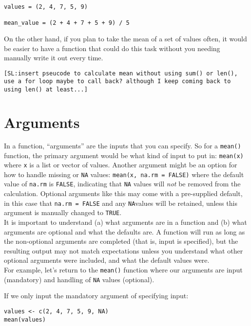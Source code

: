 \documentclass[
]{book}
\begin{document}
\begin{verbatim}
values = (2, 4, 7, 5, 9)

mean_value = (2 + 4 + 7 + 5 + 9) / 5
\end{verbatim}

\hfill\break
On the other hand, if you plan to take the mean of a set of values often, it would be easier to have a function that could do this task without you needing manually write it out every time.

\begin{verbatim}
[SL:insert pseucode to calculate mean without using sum() or len(), use a for loop maybe to call back? although I keep coming back to using len() at least...]
\end{verbatim}

\section{Arguments}\label{arguments}

In a function, ``arguments'' are the inputs that you can specify. So for a \texttt{mean()} function, the primary argument would be what kind of input to put in: \texttt{mean(x)} where \texttt{x} is a list or vector of values. Another argument might be an option for how to handle missing or \texttt{NA} values: \texttt{mean(x,\ na.rm\ =\ FALSE)} where the default value of \texttt{na.rm} is \texttt{FALSE}, indicating that \texttt{NA} values will \emph{not} be removed from the calculation. Optional arguments like this may come with a pre-supplied default, in this case that \texttt{na.rm\ =\ FALSE} and any \texttt{NA}values will be retained, unless this argument is manually changed to \texttt{TRUE}.\\

It is important to understand (a) what arguments are in a function and (b) what arguments are optional and what the defaults are. A function will run as long as the non-optional arguments are completed (that is, input is specified), but the resulting output may not match expectations unless you understand what other optional arguments were included, and what the default values were.\\

For example, let's return to the \texttt{mean()} function where our arguments are input (mandatory) and handling of \texttt{NA} values (optional).

If we only input the mandatory argument of specifying input:

\begin{verbatim}
values <- c(2, 4, 7, 5, 9, NA)
mean(values)
\end{verbatim}
\end{document}
